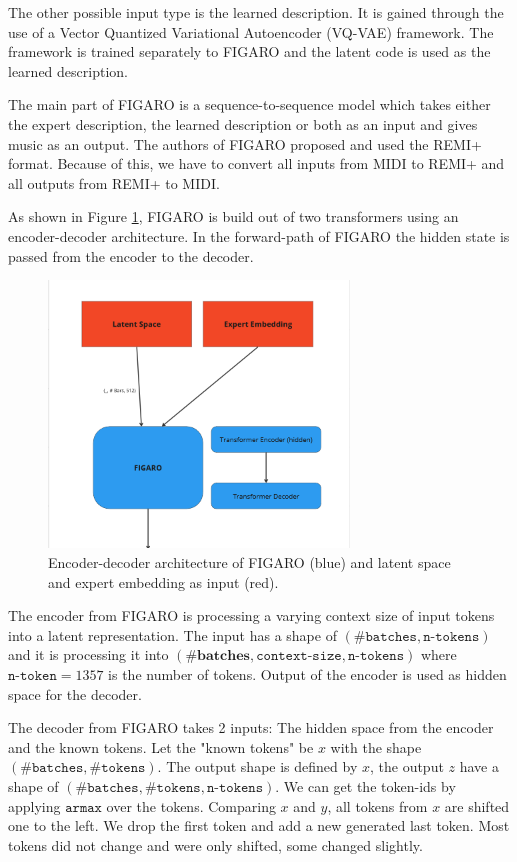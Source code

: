 \documentclass{article}
\begin{document}
The other possible input type is the learned description. It is gained through the use of a Vector Quantized Variational Autoencoder (VQ-VAE) framework. The framework is trained separately to FIGARO and the latent code is used as the learned description. 

The main part of FIGARO is a sequence-to-sequence model which takes either the expert description, the learned description or both as an input and gives music as an output.
The authors of FIGARO proposed and used the REMI+ format. Because of this, we have to convert all inputs from MIDI to REMI+ and all outputs from REMI+ to MIDI. 

As shown in Figure \ref{fig:Figaro}, FIGARO is build out of two transformers using an encoder-decoder architecture. In the forward-path of FIGARO the hidden state is passed from the encoder to the decoder.

\begin{figure}[h]
\centering
\includegraphics[width=8cm]{Figaro}
\caption{Encoder-decoder architecture of FIGARO (blue) and latent space and expert embedding as input (red).}
\label{fig:Figaro}
\end{figure}

The encoder from FIGARO is processing a varying context size of input tokens into a latent representation. The input has a shape of $(\#\texttt{batches}, \texttt{n-tokens})$ and it is processing it into $(\#\textbf{batches}, \texttt{context-size}, \texttt{n-tokens})$ where 
$\texttt{n-token}=1357$ is the number of tokens. Output of the encoder is used as hidden space for the decoder.

The decoder from FIGARO takes 2 inputs: The hidden space from the encoder and the known tokens. Let the "known tokens" be $x$ with the shape $(\#\texttt{batches}, \#\texttt{tokens})$. The output shape is defined by $x$, the output $z$ have a shape of $(\#\texttt{batches}, \#\texttt{tokens}, \texttt{n-tokens})$. We can get the token-ids by applying $\texttt{armax}$ over the tokens. Comparing $x$ and $y$, all tokens from $x$ are shifted one to the left. We drop the first token and add a new generated last token. Most tokens did not change and were only shifted, some changed slightly.
\end{document}
